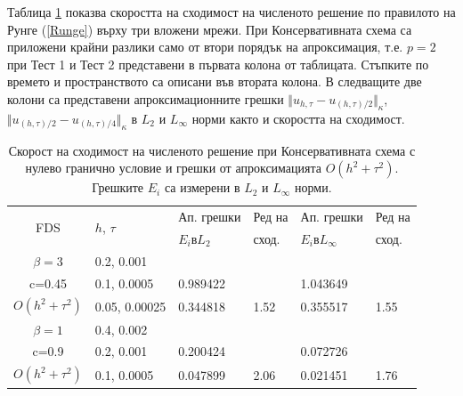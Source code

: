 \documentclass{article}
\newcommand{\rf}[1]{(\ref{#1})}
\begin{document}
Таблица \ref{tableC} показва скоростта на сходимост на численото решение по правилото на Рунге \rf{Runge} върху три вложени мрежи. При Консервативната схема са приложени крайни разлики само от втори порядък на апроксимация, т.е. $p=2$ при Тест 1 и Тест 2 представени в първата колона от таблицата. Стъпките по времето и пространството са описани във втората колона. В следващите две колони са представени апроксимационните грешки  $\Vert u_{h,\tau} - u_{(h,\tau)/2} \Vert_\kappa$, $\Vert  u_{(h,\tau)/2} - u_{(h,\tau)/4} \Vert_\kappa$ в $L_2$ и $L_{\infty}$ норми както и скоростта на сходимост.

\begin{table}[ht]
\centering
\small
		\begin{tabular}{||c|l|ll|ll||}
			\hline
			\hline
      \multirow{2  }{*}{FDS}        & \multirow{2  }{*}{$h$, $\tau$}  & Ап. грешки      &Ред на& Ап. грешки        &Ред на   \\
	                                        &                                                     &  $E_i$в$L_2$ &  сход. & $E_i$в$L_\infty$  & сход. \\
   			\hline 
					\hline 
  $\beta=3$                &0.2, 0.001         &                    &                &                  &                   \\
   c=0.45                     &0.1, 0.0005         & 0.989422   &                & 1.043649  &                   \\
     $O(h^2 + \tau^ 2)$ &0.05, 0.00025  &0.344818    & 1.52       & 0.355517   &   1.55   \\
	   \hline
			\hline 
       $\beta=1$           & 0.4, 0.002       &                   &           &                 &   \\
                  c=0.9       & 0.2, 0.001        & 0.200424   &          &0.072726  &   \\
  $O(h^2+ \tau^2)$  & 0.1, 0.0005       & 0.047899   & 2.06  &0.021451  & 1.76 \\
	   \hline
			\hline 
		\end{tabular}
		\caption{Скорост на сходимост на численото решение при Консервативната схема с нулево гранично условие и грешки от апроксимацията $O(h^{2} + \tau^2 )$. Грешките $E_i$ са измерени в $L_2$ и $L_\infty$ норми.}
\label{tableC}
\end{table}
\end{document}
